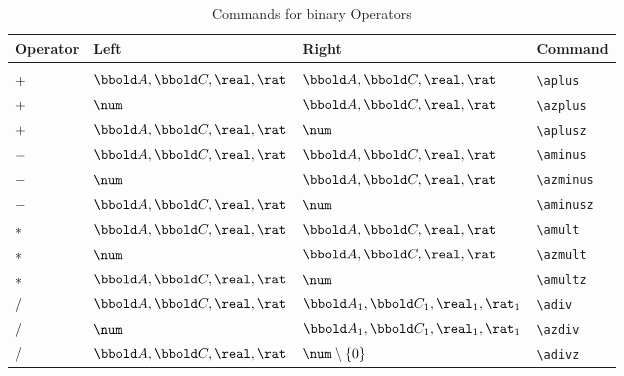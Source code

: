 \documentclass[12pt]{article}
\begin{document}
\begin{table}[htbp]
  \centering
  \begin{tabular}{llll}
    Operator & Left & Right & Command \\
    \hline \\
    $+$ & $\arithmos, \complex, \real, \rat$ & $\arithmos,
                                                    \complex, \real, \rat$ & \verb|\aplus| \\
    $+$ & $\num$ & $\arithmos, \complex, \real, \rat$ & \verb|\azplus| \\
    $+$ & $\arithmos, \complex, \real, \rat$ & $\num$ & \verb|\aplusz| \\
    $-$ & $\arithmos, \complex, \real, \rat$ & $\arithmos, \complex, \real, \rat$ & \verb|\aminus| \\
    $-$ & $\num$ & $\arithmos, \complex, \real, \rat$ & \verb|\azminus| \\
    $-$ & $\arithmos, \complex, \real, \rat$ & $\num$ & \verb|\aminusz| \\
    $*$ & $\arithmos, \complex, \real, \rat$ & $\arithmos, \complex, \real, \rat$ & \verb|\amult| \\
    $*$ & $\num$ & $\arithmos, \complex, \real, \rat$ & \verb|\azmult| \\
    $*$ & $\arithmos, \complex, \real, \rat$ & $\num$ & \verb|\amultz| \\
    $/$ & $\arithmos, \complex, \real, \rat$ & $\arithmos_1, \complex_1, \real_1, \rat_1$ & \verb|\adiv| \\
    $/$ & $\num$ & $\arithmos_1, \complex_1, \real_1, \rat_1$ & \verb|\azdiv| \\
    $/$ & $\arithmos, \complex, \real, \rat$ & $\num \setminus \{0\}$ & \verb|\adivz| \\
    \hline
  \end{tabular}
  \caption{Commands for binary Operators}
  \label{tab:latex-binary-operators}
\end{table}
%
\end{document}
